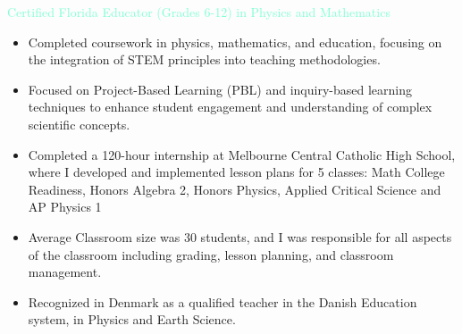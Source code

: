 \documentclass[10pt,a4paper,ragged2e,withhyper]{altacv}
\begin{document}
\begin{paracol}{2}
\begin{itemize}
\end{itemize}
\textcolor{Aquamarine}{Certified Florida Educator (Grades 6-12) in Physics and Mathematics}
\smallskip
\begin{itemize}
    \item Completed coursework in physics, mathematics, and education, focusing on the integration of STEM principles into teaching methodologies.
    \item Focused on Project-Based Learning (PBL) and inquiry-based learning techniques to enhance student engagement and understanding of complex scientific concepts.
    \item Completed a 120-hour internship at Melbourne Central Catholic High School, where I developed and implemented lesson plans for 5 classes: Math College Readiness, Honors Algebra 2, Honors Physics, Applied Critical Science and AP Physics 1
    \item Average Classroom size was 30 students, and I was responsible for all aspects of the classroom including grading, lesson planning, and classroom management.
    \item Recognized in Denmark as a qualified teacher in the Danish Education system, in Physics and Earth Science.
\end{itemize}

\switchcolumn
{}

\\
\\


\\
\\
\\
\\
\\


\end{paracol}
\end{document}
